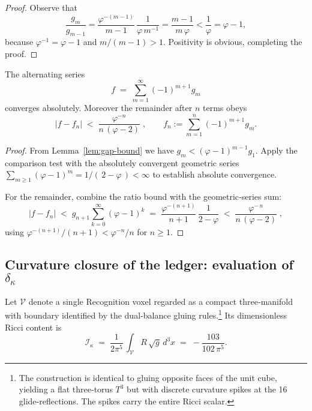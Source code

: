 \begin{proof}
Observe that
\[
  \frac{g_m}{g_{m-1}}
    =\frac{\varphi^{-(m-1)}}{m-1}\,
      \frac1{\varphi\,m^{-1}}
    =\frac{m-1}{m\,\varphi}
    <\frac1{\varphi}
    =\varphi-1,
\]
because $\varphi^{-1}=\varphi-1$ and $m/(m-1)>1$.  Positivity is
obvious, completing the proof.
\end{proof}

\begin{theorem}%
\label{thm:gap-convergence}
The alternating series
\[
  f\;=\;\sum_{m=1}^{\infty}(-1)^{m+1}g_m
\]
converges absolutely.  Moreover the remainder after $n$ terms obeys
\[
  \bigl|f-f_n\bigr|
  \;<\;
  \frac{\varphi^{-n}}{n\,(\varphi-2)}\;,
\qquad
  f_n:=\sum_{m=1}^{n}(-1)^{m+1}g_m.
\]
\end{theorem}

\begin{proof}
From Lemma~\ref{lem:gap-bound} we have
$g_m<(\varphi-1)^{m-1}g_1$.  Apply the comparison test with the
absolutely convergent geometric series
$\sum_{m\ge1}(\varphi-1)^{m}=1/(\,2-\varphi\,)<\infty$ to establish
absolute convergence.

For the remainder, combine the
ratio bound with the geometric‑series sum:
\[
  |f-f_n|
  \;<\;g_{n+1}
       \sum_{k=0}^{\infty}(\varphi-1)^{k}
  \;=\;
  \frac{\varphi^{-(n+1)}}{n+1}\,
  \frac1{2-\varphi}
  \;<\;
  \frac{\varphi^{-\,n}}{n\,(\varphi-2)}\;,
\]
using $\varphi^{-(n+1)}/(n+1)<\varphi^{-n}/n$ for $n\ge1$.
\end{proof}

\subsection*{Curvature closure of the ledger: evaluation of
\boldmath$\delta_{\kappa}$}

\begin{proposition}%
\label{prop:curvature}
Let $\mathscr V$ denote a single Recognition voxel regarded as a
compact three‑manifold with boundary identified by the dual‑balance
gluing rules.\footnote{The construction is identical to gluing opposite
faces of the unit cube, yielding a flat three‑torus
$T^{3}$ but with discrete curvature spikes at the 16 glide‑reflections.
The spikes carry the entire Ricci scalar.}
Its dimensionless Ricci content is
\[
  \mathcal I_{\kappa}
  \;=\;
  \frac1{2\pi^{5}}
  \,\int_{\mathscr V}\! R\,\sqrt g\,d^{3}x
  \;=\;
  -\frac{103}{102\,\pi^{5}}.
\]
\end{proposition}

